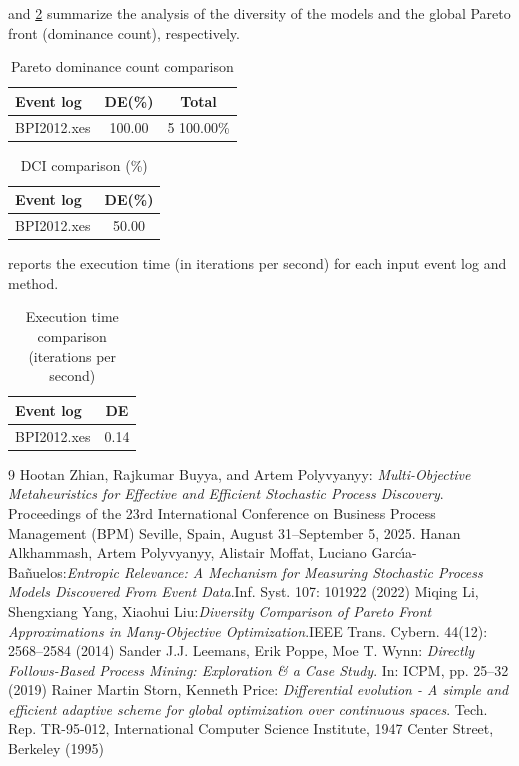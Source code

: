 \documentclass{article}
\begin{document}
\noindent
{} and \cref{tbl:dci} summarize the analysis of the diversity of the models and the global Pareto front (dominance count), respectively.
\begin{table}[h!]
\centering
\caption{Pareto dominance count comparison}
\label{tbl:dominance:count}
\setlength{\tabcolsep}{6pt}
\fontsize{8}{10}\selectfont
\begin{tabular}{lcc}
\toprule
Event log &DE(\%)&Total\\
\midrule
BPI2012.xes&100.00&5 100.00\%\\
\bottomrule
\end{tabular}
\end{table}
\begin{table}[h!]
\centering
\caption{DCI comparison (\%)}
\label{tbl:dci}
\setlength{\tabcolsep}{6pt}
\fontsize{8}{10}\selectfont
\begin{tabular}{lc}
\toprule
Event log &DE(\%)\\
\midrule
BPI2012.xes&50.00\\
\bottomrule
\end{tabular}
\end{table}
 reports the execution time (in iterations per second) for each input event log and method.
\begin{table}[h!]
\centering
\caption{Execution time comparison (iterations per second)}
\label{tbl:execution:time}
\setlength{\tabcolsep}{6pt}
\fontsize{8}{10}\selectfont
\begin{tabular}{lc}
\toprule
Event log &DE\\
\midrule
BPI2012.xes&0.14\\
\bottomrule
\end{tabular}
\end{table}
\begin{thebibliography}{9}
Hootan Zhian, Rajkumar Buyya, and Artem Polyvyanyy: \emph{Multi-Objective Metaheuristics for Effective and Efficient Stochastic Process Discovery}. Proceedings of the 23rd International Conference on Business Process Management (BPM) Seville, Spain, August 31–September 5, 2025.
Hanan Alkhammash, Artem Polyvyanyy, Alistair Moffat, Luciano Garc{\'{\i}}a{-}Ba{\~{n}}uelos:\emph{Entropic Relevance: A Mechanism for Measuring Stochastic Process Models Discovered From Event Data}.Inf. Syst. 107: 101922 (2022)
Miqing Li, Shengxiang Yang, Xiaohui Liu:\emph{Diversity Comparison of Pareto Front Approximations in Many-Objective Optimization}.IEEE Trans. Cybern. 44(12): 2568--2584 (2014)
Sander J.J. Leemans, Erik Poppe, Moe T. Wynn: \emph{Directly Follows-Based Process Mining: Exploration \& a Case Study}. In: ICPM, pp. 25–32 (2019)
Rainer Martin Storn, Kenneth Price: \emph{Differential evolution - A simple and efficient adaptive scheme for global optimization over continuous spaces}. Tech. Rep. TR-95-012, International Computer Science Institute, 1947 Center Street, Berkeley (1995)
\end{thebibliography}
\appendix
\end{document}
